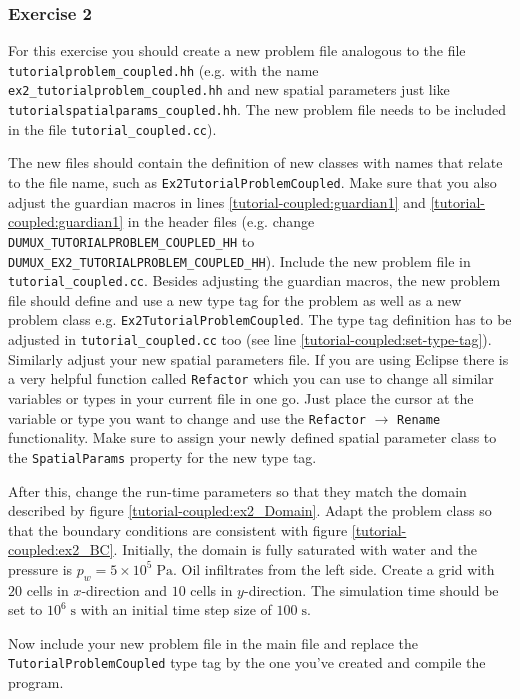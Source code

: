 \subsubsection{Exercise 2}
For this exercise you should create a new problem file analogous to
the file \texttt{tutorialproblem\_coupled.hh} (e.g. with the name
\texttt{ex2\_tutorialproblem\_coupled.hh} and new spatial parameters
just like \texttt{tutorialspatialparams\_coupled.hh}. The new
problem file needs to
be included in the file \texttt{tutorial\_coupled.cc}).

The new files should contain the definition of new classes with names
that relate to the file name, such as
\texttt{Ex2TutorialProblemCoupled}. Make sure that you also adjust the
guardian macros in lines \ref{tutorial-coupled:guardian1} and
\ref{tutorial-coupled:guardian1}
in the header files (e.g. change
\mbox{\texttt{DUMUX\_TUTORIALPROBLEM\_COUPLED\_HH}} to\\
\mbox{\texttt{DUMUX\_EX2\_TUTORIALPROBLEM\_COUPLED\_HH}}). Include the new problem file in \texttt{tutorial\_coupled.cc}. 
Besides adjusting the guardian macros, the new problem file should define and
use a new type tag for the problem as well as a new problem class
e.g. \mbox{\texttt{Ex2TutorialProblemCoupled}}. The type tag definition has to be adjusted in \texttt{tutorial\_coupled.cc} too (see line \ref{tutorial-coupled:set-type-tag}).
Similarly adjust your new spatial parameters file. If you are using Eclipse there is 
a very helpful function called \texttt{Refactor} which you can use to change
all similar variables or types in your current file in one go. Just place the cursor at the variable or type you want to change
and use the \texttt{Refactor} $\rightarrow$ \texttt{Rename} functionality. Make sure to assign your
newly defined spatial parameter class to the
\texttt{SpatialParams} property for the new
type tag. 

After this, change the run-time parameters so that they match the
domain described by figure \ref{tutorial-coupled:ex2_Domain}. Adapt
the problem class so that the boundary conditions are consistent with
figure \ref{tutorial-coupled:ex2_BC}. Initially, the domain is fully
saturated with water and the pressure is $p_w = 5 \times
10^5\;\text{Pa}$.  Oil infiltrates from the left side. Create a grid
with $20$ cells in $x$-direction and $10$ cells in $y$-direction. The
simulation time should be set to $10^6\;\text{s}$ with an
initial time step size of $100\;\text{s}$.

Now include your new problem file in the main file and replace the
\texttt{TutorialProblemCoupled} type tag by the one you've created and
compile the program.


